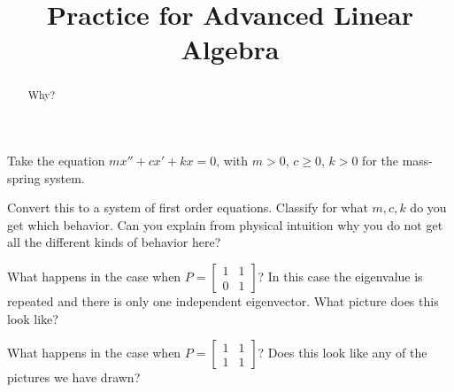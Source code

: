 \documentclass{ximera}
\title{Practice for Advanced Linear Algebra}
\begin{document}
\begin{abstract}
Why?
\end{abstract}
\maketitle

\begin{exercise}
    Take the equation $m x'' + c x' + kx = 0$, with $m > 0$, $c \geq 0$, $k > 0$ for the mass-spring system.
    \begin{tasks}
        \task Convert this to a system of first order equations.
        \task Classify for what $m, c, k$ do you get which behavior.
        \task Can you explain from physical intuition why you do not get all the different kinds of behavior here?
    \end{tasks}
\end{exercise}

\begin{exercise}
    What happens in the case when $P = \left[ \begin{smallmatrix} 1 & 1 \\ 0 & 1 \end{smallmatrix} \right]$?  In this case the eigenvalue is repeated and there is only one independent eigenvector. What picture does this look like?
\end{exercise}

\begin{exercise}
    What happens in the case when $P = \left[ \begin{smallmatrix} 1 & 1 \\ 1 & 1 \end{smallmatrix} \right]$? Does this look like any of the pictures we have drawn?
\end{exercise}
\end{document}

